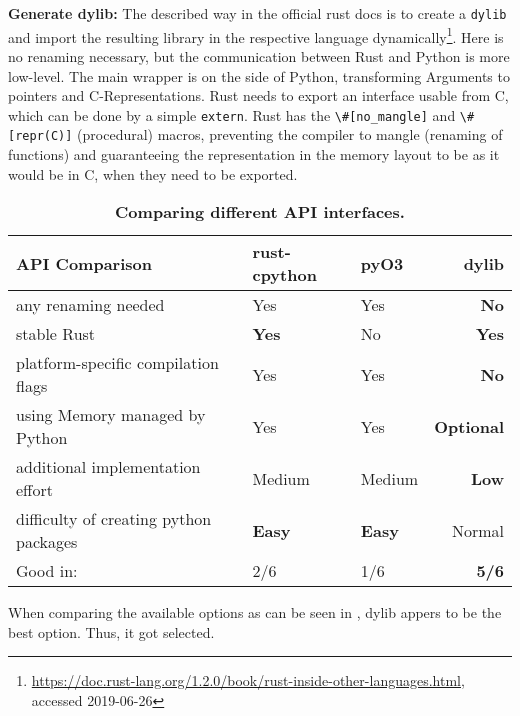 \textbf{Generate dylib:} The described way in the official rust docs is to
create a \verb|dylib| and import the resulting library in the respective
language
dynamically\footnote{\url{https://doc.rust-lang.org/1.2.0/book/rust-inside-other-languages.html}, \\
accessed 2019-06-26}.  Here is no renaming necessary, but the
communication between Rust and Python is more low-level. The main wrapper
is on the side of Python, transforming Arguments to pointers and
C-Representations. Rust needs to export an interface usable from C, which can
be done by a simple \verb|extern|. Rust has the \verb!\#[no_mangle]! and
\verb!\#[repr(C)]! (procedural) macros, preventing the compiler to mangle
(renaming of functions) and guaranteeing the representation in the memory
layout to be as it would be in C, when they need to be exported.


\begin{table}[ht]
\begin{tabular}{@{}lllr@{}}
    \textbf{API Comparison} & rust-cpython & pyO3 & dylib \\
    \midrule
    any renaming needed             & Yes    & Yes & \textbf{No} \\
    stable Rust                     & \textbf{Yes}    & No  & \textbf{Yes} \\
    platform-specific compilation flags & Yes & Yes & \textbf{No} \\
    using Memory managed by Python  & Yes    & Yes & \textbf{Optional} \\
    additional implementation effort                 & Medium & Medium & \textbf{Low} \\
    difficulty of creating python packages        & \textbf{Easy}\footnotemark  & \textbf{Easy}\footnotemark[\value{footnote}] & Normal \\
    \midrule
    Good in: & 2/6 & 1/6 & \textbf{5/6} \\
\end{tabular}
    \caption[Comparison of different Interfaces between Rust and Python]{\textbf{Comparing different API interfaces.}}
    \label{tab:interfaces}
\end{table}


When comparing the available options as can be seen in ,
dylib appers to be the best option. Thus, it got selected.


